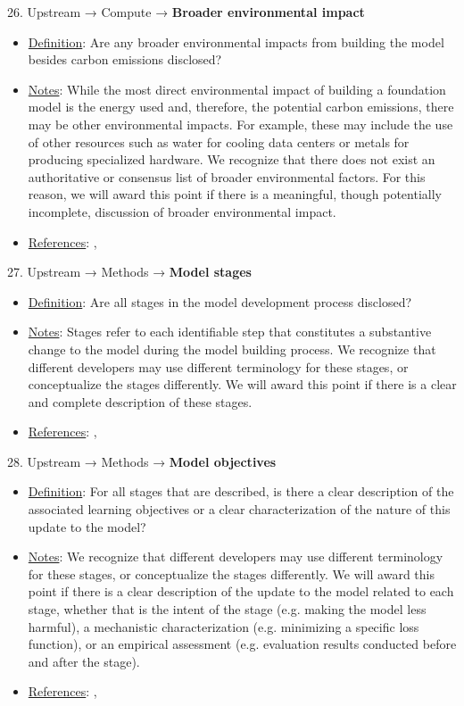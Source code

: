 26. Upstream → Compute → \textbf{Broader environmental impact}
\vspace{-\parskip}
\begin{itemize}
\item
\underline{Definition}: Are any broader environmental impacts from building the model besides carbon emissions disclosed?
\item
\underline{Notes}: While the most direct environmental impact of building a foundation model is the energy used and, therefore, the potential carbon emissions, there may be other environmental impacts. For example, these may include the use of other resources such as water for cooling data centers or metals for producing specialized hardware. We recognize that there does not exist an authoritative or consensus list of broader environmental factors. For this reason, we will award this point if there is a meaningful, though potentially incomplete, discussion of broader environmental impact.
\item
\underline{References}: \citet{luccioni2023counting}, \citet{strubell2019energy}
\end{itemize}


27. Upstream → Methods → \textbf{Model stages}
\vspace{-\parskip}
\begin{itemize}
\item
\underline{Definition}: Are all stages in the model development process disclosed?
\item
\underline{Notes}: Stages refer to each identifiable step that constitutes a substantive change to the model during the model building process. We recognize that different developers may use different terminology for these stages, or conceptualize the stages differently. We will award this point if there is a clear and complete description of these stages.
\item
\underline{References}: \citet{mitchell2019model}, \citet{chung2022scaling}
\end{itemize}


28. Upstream → Methods → \textbf{Model objectives}
\vspace{-\parskip}
\begin{itemize}
\item
\underline{Definition}: For all stages that are described, is there a clear description of the associated learning objectives or a clear characterization of the nature of this update to the model?
\item
\underline{Notes}: We recognize that different developers may use different terminology for these stages, or conceptualize the stages differently. We will award this point if there is a clear description of the update to the model related to each stage, whether that is the intent of the stage (e.g. making the model less harmful), a mechanistic characterization (e.g. minimizing a specific loss function), or an empirical assessment (e.g. evaluation results conducted before and after the stage).
\item
\underline{References}: \citet{mitchell2019model}, \citet{chung2022scaling}
\end{itemize}


